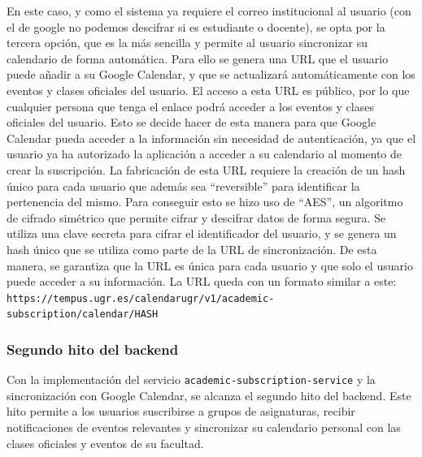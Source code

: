 En este caso, y como el sistema ya requiere el correo institucional al usuario (con el de google no podemos descifrar si es estudiante o docente), se opta por la tercera opción, que es la más sencilla y permite al usuario sincronizar su calendario de forma automática. Para ello se genera una URL que el usuario puede añadir a su Google Calendar, y que se actualizará automáticamente con los eventos y clases oficiales del usuario.
El acceso a esta URL es público, por lo que cualquier persona que tenga el enlace podrá acceder a los eventos y clases oficiales del usuario. Esto se decide hacer de esta manera para que Google Calendar pueda acceder a la información sin necesidad de autenticación, ya que el usuario ya ha autorizado la aplicación a acceder a su calendario al momento de crear la suscripción.
\newline
La fabricación de esta URL requiere la creación de un hash único para cada usuario que además sea ``reversible'' para identificar la pertenencia del mismo. Para conseguir esto se hizo uso de ``AES'', un algoritmo de cifrado simétrico que permite cifrar y descifrar datos de forma segura. Se utiliza una clave secreta para cifrar el identificador del usuario, y se genera un hash único que se utiliza como parte de la URL de sincronización. De esta manera, se garantiza que la URL es única para cada usuario y que solo el usuario puede acceder a su información.
\newline\newline
La URL queda con un formato similar a este: \texttt{https://tempus.ugr.es/calendarugr/v1/academic-subscription/calendar/{HASH}}

\subsubsection{Segundo hito del backend}

Con la implementación del servicio \texttt{academic-subscription-service} y la sincronización con Google Calendar, se alcanza el segundo hito del backend. Este hito permite a los usuarios suscribirse a grupos de asignaturas, recibir notificaciones de eventos relevantes y sincronizar su calendario personal con las clases oficiales y eventos de su facultad.

